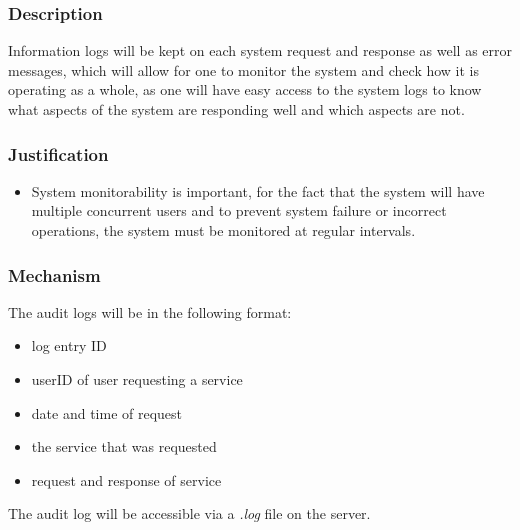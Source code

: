 	\subsubsection*{Description}
		Information logs will be kept on each system request and response as well as error messages, which will allow for one to monitor the system and check how it is operating as a whole, as one will have easy access to the system logs to know what aspects of the system are responding well and which aspects are not. 
	\subsubsection*{Justification}
	\begin{itemize}
		\item System monitorability is important, for the fact that the system will have multiple concurrent users and to prevent system failure or incorrect operations, the system must be monitored at regular intervals.	
	\end{itemize}	
	\subsubsection*{Mechanism}
	 The audit logs will be in the following format:	
		\begin{itemize}
			\item log entry ID
			\item userID of user requesting a service
			\item date and time of request
			\item the service that was requested
			\item request and response of service
		\end{itemize}
		The audit log will be accessible via a \textit{.log} file on the server.
		
